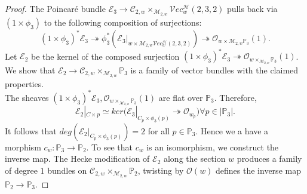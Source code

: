 \documentclass[10pt,a4paper]{amsart}
\newcommand{\e}{\mathcal{E}}
\newcommand{\h}{\mathcal{H}}
\newcommand{\m}{\mathcal{M}}
\newcommand{\mC}{\mathcal{C}}
\newcommand{\mo}{\mathcal{O}}
\newcommand{\p}{\mathbb{P}}
\newcommand{\ri}{\rightarrow}
\newcommand{\ve}{\mathcal{V}ec}
\begin{document}
\begin{proof}
	The Poincar\'e bundle $\e_3\ri \mathcal{C}_{2,w}\times_{\mathcal{M}_{2,w}} \ve_w^\h(2,3,2)$ pulls back via $(1\times \phi_3)$ to the following composition of surjections:
	$$(1\times \phi_3)^*\e_3\twoheadrightarrow \phi_3^*(\e_3|_{w\times{\mathcal{M}_{2,w}} \ve_w^\h(2,3,2)})\twoheadrightarrow \mo_{w\times{\mathcal{M}_{2,w}}\p_3}(1).$$
Let $\e_2$ be the kernel of the composed surjection $(1\times \phi_3)^*\e_3\twoheadrightarrow\mo_{w\times_{\mathcal{M}_{2,w}}\p_3}(1)$. We show that $\e_2\ri \mathcal{C}_{2,w}\times_{\mathcal{M}_{2,w}} \p_3$ is a family of vector bundles with the claimed properties.\\
The sheaves $(1\times \phi_3)^*\e_3,\mo_{w\times_{\mathcal{M}_{2,w}} \p_3}(1)$ are flat over $\p_3$. Therefore, 
$$\e_2|_{C\times p}\simeq ker(\e_3|_{C_p\times \phi_3(p)}\twoheadrightarrow \mo_{w_p}) \forall p\in |\p_3|.$$
It follows that $deg(\e_2|_{C_p\times \phi_3(p)})=2 $ for all $p\in \p_3$. Hence we a have a morphism $c_w:\p_3\ri \p_2$.
To see that $c_w$ is an isomorphism, we construct the inverse map. The Hecke modification of $\e_2$ along the section $w$ produces a family of degree $1$ bundles on $\mC_{2,w}\times_{\m_{2,w}}\p_2$, twisting by $\mo(w)$ defines the inverse map $\p_2\ri \p_3$.
\end{proof}
\end{document}
